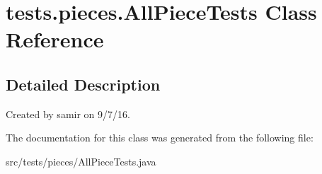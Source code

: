 \hypertarget{classtests_1_1pieces_1_1_all_piece_tests}{}\section{tests.\+pieces.\+All\+Piece\+Tests Class Reference}
\label{classtests_1_1pieces_1_1_all_piece_tests}


\subsection{Detailed Description}
Created by samir on 9/7/16. 

The documentation for this class was generated from the following file\+:\begin{DoxyCompactItemize}
\item 
src/tests/pieces/All\+Piece\+Tests.\+java\end{DoxyCompactItemize}
